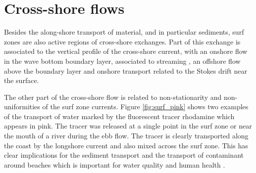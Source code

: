
\section{Cross-shore flows}
Besides the along-shore transport of material, and in particular sediments, surf zones are also active regions of cross-shore exchanges. Part of this exchange is associated to the vertical profile of the cross-shore current, with an onshore flow in the wave bottom boundary layer, associated to streaming \citep{Longuet-Higgins1953}, an offshore flow above the boundary layer and onshore transport related to the Stokes drift near the surface.  

The other part of the cross-shore flow is related to non-stationarity and non-uniformities of the surf zone currents. Figure \ref{fig:surf_pink} shows two examples of the transport of water marked by the fluorescent tracer rhodamine which appears in pink. The tracer was released at a single point in the surf zone or near the mouth of a river during the ebb flow. 
The tracer is clearly transported along the coast by the longshore current and also mixed across the surf zone. This has clear implications for the sediment transport and the transport of contaminant around beaches which is important for water quality and human health \citep{Delpey&al.2014}.


